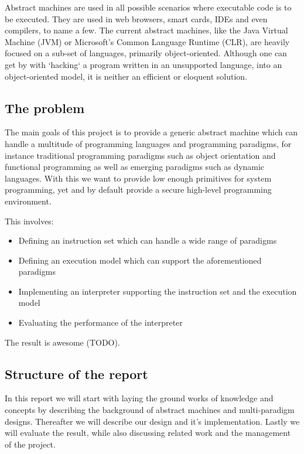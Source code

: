 

Abstract machines are used in all possible scenarios where executable code is to
be executed. They are used in web browsers, smart cards, IDEs and even
compilers, to name a few. The current abstract machines, like the Java Virtual
Machine (JVM) or Microsoft's Common Language Runtime (CLR), are heavily focused
on a sub-set of languages, primarily object-oriented. Although one can get by
with `hacking` a program written in an unsupported language, into an
object-oriented model, it is neither an efficient or eloquent solution.


\subsection{The problem}

The main goals of this project is to provide a generic abstract machine which
can handle a multitude of programming languages and programming paradigms, for
instance traditional programming paradigms such as object orientation and
functional programming as well as emerging paradigms such as dynamic
languages. With this we want to provide low enough primitives for system
programming, yet and by default provide a secure high-level programming
environment.

This involves:
\begin{itemize}
\item Defining an instruction set which can handle a wide range of paradigms
\item Defining an execution model which can support the aforementioned paradigms
\item Implementing an interpreter supporting the instruction set and the execution model
\item Evaluating the performance of the interpreter
\end{itemize}

The result is awesome (TODO).


\subsection{Structure of the report}

In this report we will start with laying the ground works of knowledge and
concepts by describing the background of abstract machines and multi-paradigm
designs. Thereafter we will describe our design and it's implementation. Lastly
we will evaluate the result, while also discussing related work and the
management of the project.
